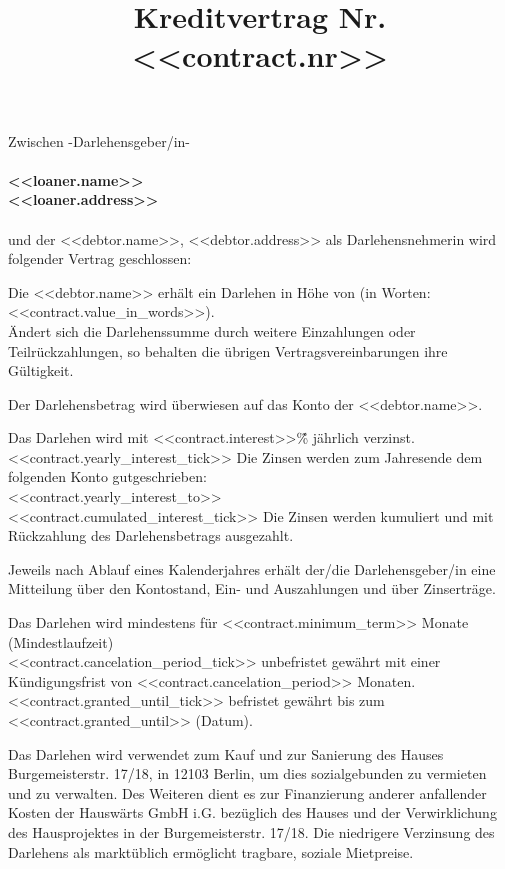 \documentclass[]{scrartcl}
\title{\vspace{-10pt}Kreditvertrag Nr. <<contract.nr>>\vspace{-30pt}}
\date{}
\begin{document}
\maketitle \thispagestyle{fancy}

\noindent Zwischen -Darlehensgeber/in- \\ \\
 \textbf{<<loaner.name>>\\ <<loaner.address>>}  \\ \\
und der <<debtor.name>>, <<debtor.address>> als Darlehensnehmerin wird folgender Vertrag geschlossen:

\begin{contract}


Die <<debtor.name>> erhält ein Darlehen in Höhe von \textbf{} (in Worten: <<contract.value_in_words>>). \\
Ändert sich die Darlehenssumme durch weitere Einzahlungen oder Teilrückzahlungen, so behalten die
übrigen Vertragsvereinbarungen ihre Gültigkeit.

Der Darlehensbetrag wird überwiesen auf das Konto der <<debtor.name>>.

Das Darlehen wird  mit <<contract.interest>>\~\% jährlich verzinst. \\
<<contract.yearly_interest_tick>> Die Zinsen werden zum Jahresende dem folgenden Konto gutgeschrieben: \\<<contract.yearly_interest_to>> \\
<<contract.cumulated_interest_tick>> Die Zinsen werden kumuliert und mit Rückzahlung des Darlehensbetrags ausgezahlt.

Jeweils nach Ablauf eines Kalenderjahres erhält der/die Darlehensgeber/in eine Mitteilung über den
Kontostand, Ein- und Auszahlungen und über Zinserträge.

Das Darlehen wird mindestens für <<contract.minimum_term>> Monate (Mindestlaufzeit) \\
 <<contract.cancelation_period_tick>> unbefristet gewährt mit einer Kündigungsfrist von <<contract.cancelation_period>> Monaten. \\
 <<contract.granted_until_tick>> befristet gewährt bis zum <<contract.granted_until>> (Datum).

Das Darlehen wird verwendet zum Kauf und zur Sanierung des Hauses Burgemeisterstr. 17/18, in 12103 Berlin, um dies sozialgebunden zu vermieten und zu verwalten. Des Weiteren dient es zur Finanzierung anderer anfallender Kosten der Hauswärts GmbH i.G. bezüglich des Hauses und der Verwirklichung des Hausprojektes in der Burgemeisterstr. 17/18. Die niedrigere Verzinsung des Darlehens als marktüblich ermöglicht tragbare, soziale Mietpreise.


\end{contract}
\end{document}
